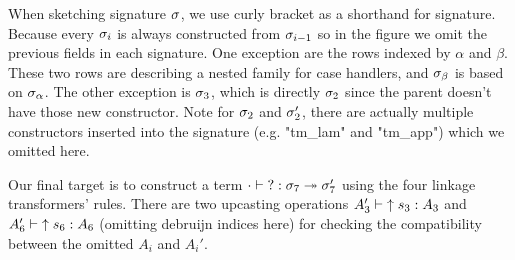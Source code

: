 When sketching signature $\sigma$, we use curly bracket as a shorthand for signature. Because every $\sigma_i$ is always constructed from $\sigma_{i-1}$ so in the figure we omit the previous fields in each signature.  One exception are the rows indexed by $\alpha$ and $\beta$. These two rows are describing a nested family for case handlers, and $\sigma_\beta$ is based on $\sigma_\alpha$. The other exception is $\sigma_3$, which is directly $\sigma_2$ since the parent doesn't have those new constructor. Note for $\sigma_2$ and $\sigma_2'$, there are actually multiple constructors inserted into the signature (e.g. "tm_lam" and "tm_app") which we omitted here.


Our final target is to construct a term $ {\cdot} \vdash {?} : {\sigma_7} \twoheadrightarrow {\ensuremath{\sigma}_7'}$ using the four linkage transformers' rules. There are two upcasting operations $ {A_3'} \vdash {\uparrow s_3} : {A_3} $ and $ {A_6'} \vdash {\uparrow s_6} : {A_6} $ (omitting debruijn indices here) for checking the compatibility between the omitted $A_i$ and $A_i'$.
